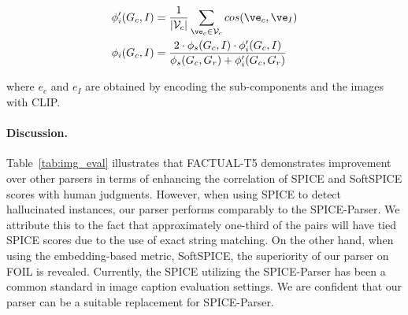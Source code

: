 \vspace{-2mm}
\begin{small}
\begin{align}
    \phi'_i(G_c,I) &= \frac{1}{|\mathcal{V}_c|}\sum_{\ve_c\in\mathcal{V}_c}cos(\ve_c,\ve_I)\\
    \phi_i(G_c,I) &= \frac{2\cdot\phi_s(G_c,I)\cdot\phi'_i(G_c,I)}{\phi_s(G_c,G_r)+\phi'_i(G_c,G_r)}
\end{align}
\end{small}

\noindent
where $e_c$ and $e_I$ are obtained by encoding the sub-components and the images with CLIP.

\paragraph{Discussion.} Table~\ref{tab:img_eval} illustrates that FACTUAL-T5 demonstrates improvement over other parsers in terms of enhancing the correlation of SPICE and SoftSPICE scores with human judgments. However, when using SPICE to detect hallucinated instances, our parser performs comparably to the SPICE-Parser. We attribute this to the fact that approximately one-third of the pairs will have tied SPICE scores due to the use of exact string matching. On the other hand, when using the embedding-based metric, SoftSPICE, the superiority of our parser on FOIL is revealed. Currently, the SPICE utilizing the SPICE-Parser has been a common standard in image caption evaluation settings. We are confident that our parser can be a suitable replacement for SPICE-Parser. \begin{table}[t]
\centering
    \caption{ The results comparing SoftSPICE with current SOTA image caption evaluation metrics. We use FACTUAL-T5 as the parser for SoftSPICE. 
     \vspace{-2mm} }
  \label{tab:img_eval_sota}
    \vspace{-3mm}
\end{table}
 
